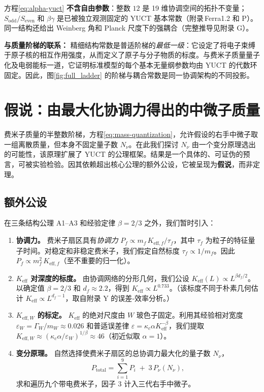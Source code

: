 \documentclass[12pt,a4paper]{article}
\begin{document}
	方程\eqref{eq:alpha-yuct} \textbf{不含自由参数}：整数 \(12\) 是 19 维协调空间的拓扑不变量；\(S_{\mathrm{odd}}/S_{\mathrm{even}}\) 和 \(\beta\gamma\) 是已被独立观测固定的 YUCT 基本常数（附录 Ferra1.2 和 P）。同一结构还给出 Weinberg 角和 Planck 尺度下的强耦合（完整推导见附录 G）。
	
	\textbf{与质量阶梯的联系：} 精细结构常数是普适阶梯的\textit{最低一级}：它设定了将电子束缚于原子核的相互作用强度，从而定义了原子与分子物质的标度。与费米子质量量子化及电弱能标一道，它证明标准模型的每个基本无量纲参数均由 YUCT 的代数环固定。因此，图\ref{fig:full_ladder} 的阶梯与耦合常数是同一协调架构的不同投影。
	
	\section{假说：由最大化协调力得出的中微子质量}
	\label{sec:neutrino-hypothesis}
	
	费米子质量的半整数阶梯，方程\eqref{eq:mass-quantization}，允许假设的右手中微子取一组离散质量，但本身不固定量子数 \(N_{\nu}\)。在此我们探讨 \(N_{\nu}\) 由一个变分原理选出的可能性，该原理扩展了 YUCT 的公理框架。结果是一个具体的、可证伪的预言，可被实验检验。因其依赖超出核心公理的额外公设，它被呈现为\textbf{假说}，而非定理。
	
	\subsection{额外公设}
	
	在三条结构公理 A1--A3 和经验定律 \(\beta=2/3\) 之外，我们暂时引入：
	
	\begin{enumerate}[label=\textbf{P\arabic*}:, leftmargin=*]
		\item \textbf{协调力。} 费米子扇区具有\textit{协调力} \(P_f \propto m_f \, K_{\mathrm{eff},f}/\tau_f\)，其中 \(\tau_f\) 为粒子的特征量子时间。对稳定和非稳定费米子，我们假定自然标度 \(\tau_f \propto 1/m_f\)。因此 \(P_f \propto m_f^2 \, K_{\mathrm{eff},f}\)（至不重要的归一化）。
		\item \textbf{\(K_{\mathrm{eff}}\) 对深度的标度。} 由协调网络的分形几何，我们公设 \(K_{\mathrm{eff}}(L) \propto L^{\beta d_f/2}\)。以确定值 \(\beta=2/3\) 和 \(d_f\approx2.2\)，得到 \(K_{\mathrm{eff}} \propto L^{0.733}\)。（该标度不同于朴素几何估计 \(K_{\mathrm{eff}}\propto L^{d_f-1}\)，取自附录 Y 的误差‑效率分析。）
		\item \textbf{\(K_{\mathrm{eff},W}\) 的标定。} \(K_{\mathrm{eff}}\) 的绝对尺度由 \(W\) 玻色子固定。利用其经验相对宽度 \(\varepsilon_W = \Gamma_W/m_W \approx 0.026\) 和普适误差律 \(\varepsilon = \kappa_c \alpha K_{\mathrm{eff}}^{-\beta}\)，我们提取 \(K_{\mathrm{eff},W} \approx (\kappa_c \alpha / \varepsilon_W)^{1/\beta} \approx 46\)（初近似取 \(\alpha=1\)）。
		\item \textbf{变分原理。} 自然选择使费米子扇区的总协调力最大化的量子数 \(N_{\nu}\)，
		\begin{equation}
			P_{\mathrm{total}} = \sum_{i=1}^{9} P_i \;+\; 3\,P_{\nu}(N_{\nu}),
		\end{equation}
		求和遍历九个带电费米子，因子 \(3\) 计入三代右手中微子。
	\end{enumerate}
	
\end{document}
